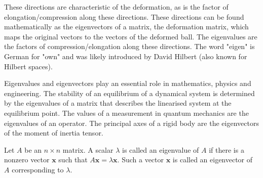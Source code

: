 \documentclass[
  a4paper,
  DIV=11,
  numbers=noendperiod,
  oneside]{scrreprt}
\theoremstyle{definition}
\theoremstyle{remark}
\newenvironment{fbxSimple}[3]{\begin{tcolorbox}[enhanced, breakable,%
attach boxed title to top*={xshift=1.4pt},
boxed title style={boxrule=0.0mm, fuzzy shadow={1pt}{-1pt}{0mm}{0.1mm}{gray}, arc=.3em, rounded corners=east, sharp corners=west}, colframe=#1-color2, colbacktitle=#1-color1, colback = white, coltitle=black,  titlerule=0mm, toprule=0pt, bottomrule=.7pt, leftrule=.3em, rightrule=.7pt, outer arc=.3em,  	left=.5em, right=.5em, bottomtitle=1mm, toptitle=1mm,title=\textbf{#2}\hspace{0.5em}{#3}]}
{\end{tcolorbox}}
\begin{document}
These directions are characteristic of the deformation, as is the factor
of elongation/compression along these directions. These directions can
be found mathematically as the eigenvectors of a matrix, the deformation
matrix, which maps the original vectors to the vectors of the deformed
ball. The eigenvalues are the factors of compression/elongation along
these directions. The word "eigen" is German for "own" and was likely
introduced by David Hilbert (also known for Hilbert spaces).

Eigenvalues and eigenvectors play an essential role in mathematics,
physics and engineering. The stability of an equilibrium of a dynamical
system is determined by the eigenvalues of a matrix that describes the
linearised system at the equilibrium point. The values of a measurement
in quantum mechanics are the eigenvalues of an operator. The principal
axes of a rigid body are the eigenvectors of the moment of inertia
tensor.

\label{eigenvalue-and-eigenvector}
\begin{fbxSimple}{Definition}{Definition 5.1: }{Eigenvalue and Eigenvector}
\label{eigenvalue-and-eigenvector}
Let \(A\) be an \(n \times n\) matrix. A scalar \(\lambda\) is called an
eigenvalue of \(A\) if there is a nonzero vector \(\mathbf{x}\) such
that \(A\mathbf{x} = \lambda \mathbf{x}\). Such a vector \(\mathbf{x}\)
is called an eigenvector of \(A\) corresponding to \(\lambda\).

\end{fbxSimple}
\end{document}
